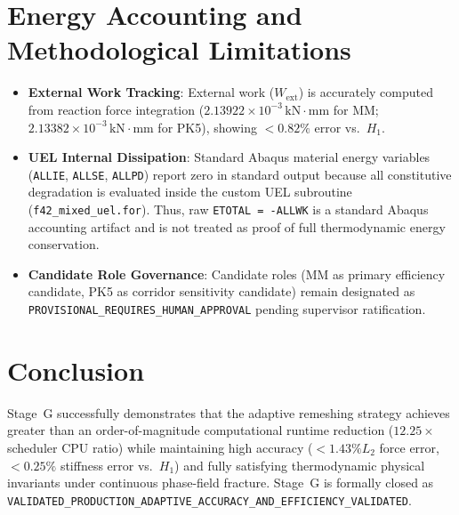 \section{Energy Accounting and Methodological Limitations}
\begin{itemize}
    \item \textbf{External Work Tracking}: External work ($W_{\mathrm{ext}}$) is accurately computed from reaction force integration ($2.13922\times 10^{-3}\,\text{kN}\cdot\text{mm}$ for MM; $2.13382\times 10^{-3}\,\text{kN}\cdot\text{mm}$ for PK5), showing $<0.82\%$ error vs.\ $H_1$.
    \item \textbf{UEL Internal Dissipation}: Standard Abaqus material energy variables (\texttt{ALLIE}, \texttt{ALLSE}, \texttt{ALLPD}) report zero in standard output because all constitutive degradation is evaluated inside the custom UEL subroutine (\texttt{f42\_mixed\_uel.for}). Thus, raw \texttt{ETOTAL = -ALLWK} is a standard Abaqus accounting artifact and is not treated as proof of full thermodynamic energy conservation.
    \item \textbf{Candidate Role Governance}: Candidate roles (MM as primary efficiency candidate, PK5 as corridor sensitivity candidate) remain designated as \texttt{PROVISIONAL\_REQUIRES\_HUMAN\_APPROVAL} pending supervisor ratification.
\end{itemize}

\section{Conclusion}
Stage~G successfully demonstrates that the adaptive remeshing strategy achieves greater than an order-of-magnitude computational runtime reduction ($12.25\times$ scheduler CPU ratio) while maintaining high accuracy ($<1.43\% L_2$ force error, $<0.25\%$ stiffness error vs.\ $H_1$) and fully satisfying thermodynamic physical invariants under continuous phase-field fracture. Stage~G is formally closed as \texttt{VALIDATED\_PRODUCTION\_ADAPTIVE\_ACCURACY\_AND\_EFFICIENCY\_VALIDATED}.
